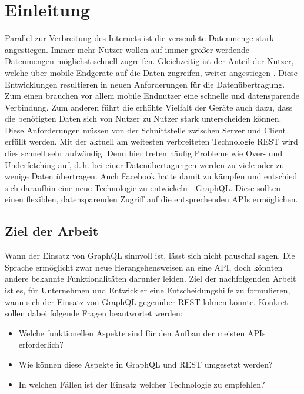 \chapter{Einleitung}

Parallel zur Verbreitung des Internets ist die versendete Datenmenge stark angestiegen. Immer mehr Nutzer wollen auf immer größer werdende Datenmengen möglichst schnell zugreifen. Gleichzeitig ist der Anteil der Nutzer, welche über mobile Endgeräte auf die Daten zugreifen, weiter angestiegen \parencite{Enge2019}.
Diese Entwicklungen resultieren in neuen Anforderungen für die Datenübertragung. Zum einen brauchen vor allem mobile Endnutzer eine schnelle und datensparende Verbindung. Zum anderen führt die erhöhte Vielfalt der Geräte auch dazu, dass die benötigten Daten sich von Nutzer zu Nutzer stark unterscheiden können.
\\
Diese Anforderungen müssen von der Schnittstelle zwischen Server und Client erfüllt werden. Mit der aktuell am weitesten verbreiteten Technologie REST wird dies schnell sehr aufwändig. Denn hier treten häufig Probleme wie Over- und Underfetching auf, d.\,h. bei einer Datenübertagungen werden zu viele oder zu wenige Daten übertragen. Auch Facebook hatte damit zu kämpfen und entschied sich daraufhin eine neue Technologie zu entwickeln - GraphQL. Diese sollten einen flexiblen, datensparenden Zugriff auf die entsprechenden APIs ermöglichen. 

\section{Ziel der Arbeit}

Wann der Einsatz von GraphQL sinnvoll ist, lässt sich nicht pauschal sagen. Die Sprache ermöglicht zwar neue Herangehensweisen an eine API, doch könnten andere bekannte Funktionalitäten darunter leiden. Ziel der nachfolgenden Arbeit ist es, für Unternehmen und Entwickler eine Entscheidungshilfe zu formulieren, wann sich der Einsatz von GraphQL gegenüber REST lohnen könnte. Konkret sollen dabei folgende Fragen beantwortet werden:

\begin{itemize}
\item Welche funktionellen Aspekte sind für den Aufbau der meisten APIs erforderlich?
\item Wie können diese Aspekte in GraphQL und REST umgesetzt werden?
\item In welchen Fällen ist der Einsatz welcher Technologie zu empfehlen?
\end{itemize}

